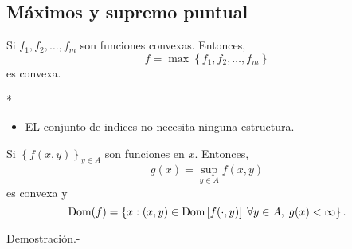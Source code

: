 \begin{paracol}{2}
\subsection{Máximos y supremo puntual}

\begin{teo} Si $f_1,f_2,\ldots,f_m$ son funciones convexas. Entonces,
    $$f=\max\left\{f_1,f_2,\ldots,f_m\right\}$$ 
    es convexa.
\end{teo}

\switchcolumn[1]*{\noindent\scriptsize
	\begin{itemize}
	    \item EL conjunto de indices no necesita ninguna estructura.
	\end{itemize}
}
\switchcolumn[0]\noindent
\begin{teo} Si $\left\{f(x,y)\right\}_{y\in A}$ son funciones en $x$. Entonces,
    $$g(x)=\sup_{y\in A}f(x,y)$$
    es convexa y 
    $$\mathop{\mbox{\normalfont Dom}}\nolimits(f)=\left\{x:(x,y)\in \mathop{\mbox{\normalfont Dom}}\nolimits\left[f(\cdot,y)\right]\;\forall y\in A,\; g(x)<\infty\right\}.$$

    Demostración.-\; 

\end{teo}

\end{paracol}
